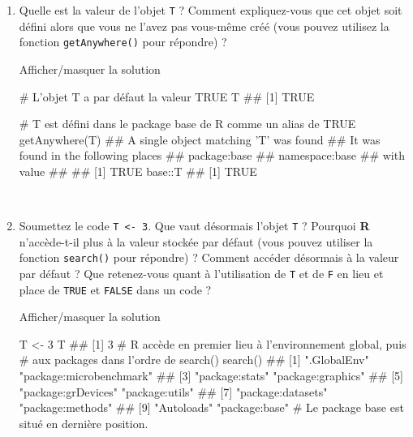 \documentclass[12pt,]{article}
\newenvironment{Shaded}{}{}
\newcommand{\KeywordTok}[1]{\textcolor[rgb]{0.00,0.00,1.00}{{#1}}}
\newcommand{\DecValTok}[1]{{#1}}
\newcommand{\StringTok}[1]{\textcolor[rgb]{0.00,0.50,0.50}{{#1}}}
\newcommand{\CommentTok}[1]{\textcolor[rgb]{0.00,0.50,0.00}{{#1}}}
\newcommand{\NormalTok}[1]{{#1}}
\begin{document}
\begin{enumerate}
  ~
\item
  Quelle est la valeur de l'objet \texttt{T} ? Comment expliquez-vous
  que cet objet soit défini alors que vous ne l'avez pas vous-même créé
  (vous pouvez utilisez la fonction \texttt{getAnywhere()} pour
  répondre) ?

  Afficher/masquer la solution

  \hypertarget{sol18}{}
\begin{Shaded}
\begin{Highlighting}[]
\CommentTok{# L'objet T a par défaut la valeur TRUE}
\NormalTok{T}
\NormalTok{## [1] TRUE}

\CommentTok{# T est défini dans le package base de R comme un alias de TRUE}
\KeywordTok{getAnywhere}\NormalTok{(T)}
\NormalTok{## A single object matching 'T' was found}
\NormalTok{## It was found in the following places}
\NormalTok{##   package:base}
\NormalTok{##   namespace:base}
\NormalTok{## with value}
\NormalTok{## }
\NormalTok{## [1] TRUE}
\NormalTok{base::T}
\NormalTok{## [1] TRUE}
\end{Highlighting}
\end{Shaded}

  ~
\item
  Soumettez le code \texttt{T\ \textless{}-\ 3}. Que vaut désormais
  l'objet \texttt{T} ? Pourquoi \textbf{R} n'accède-t-il plus à la
  valeur stockée par défaut (vous pouvez utiliser la fonction
  \texttt{search()} pour répondre) ? Comment accéder désormais à la
  valeur par défaut ? Que retenez-vous quant à l'utilisation de
  \texttt{T} et de \texttt{F} en lieu et place de \texttt{TRUE} et
  \texttt{FALSE} dans un code ?

  Afficher/masquer la solution

  \hypertarget{sol19}{}
\begin{Shaded}
\begin{Highlighting}[]
\NormalTok{T <-}\StringTok{ }\DecValTok{3}
\NormalTok{T }
\NormalTok{## [1] 3}
\CommentTok{# R accède en premier lieu à l'environnement global, puis}
\CommentTok{# aux packages dans l'ordre de search()}
\KeywordTok{search}\NormalTok{()}
\NormalTok{##  [1] ".GlobalEnv"             "package:microbenchmark"}
\NormalTok{##  [3] "package:stats"          "package:graphics"      }
\NormalTok{##  [5] "package:grDevices"      "package:utils"         }
\NormalTok{##  [7] "package:datasets"       "package:methods"       }
\NormalTok{##  [9] "Autoloads"              "package:base"}
\CommentTok{# Le package base est situé en dernière position.}


\end{Highlighting}
\end{Shaded}
\end{enumerate}
\end{document}
